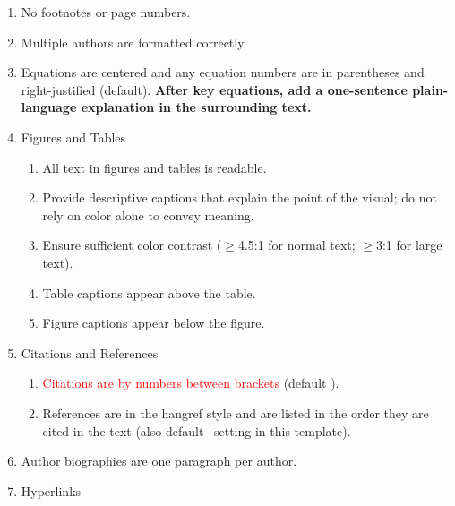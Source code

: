 \documentclass{scspaperproc}
\theoremstyle{scsthe}
\begin{document}
\begin{enumerate}
\begin{enumerate}
            \item Subsection headings are set in \textbf{Boldface Headline Style} (default in this template).
            \item \textbf{Follow a logical order (\textbackslash section $\rightarrow$ \textbackslash subsection $\rightarrow$ \textbackslash subsubsection); do    not skip levels}.
        \end{enumerate}
        \item No footnotes or page numbers.
        \item Multiple authors are formatted correctly.
        \item Equations are centered and any equation numbers are in parentheses and right-justified (default). \textbf{After key equations, add a one-sentence plain-language explanation in the surrounding text.}
        \item Figures and Tables
        \begin{enumerate}
            \item All text in figures and tables is readable.
            \item Provide descriptive captions that explain the point of the visual;    do not rely on color alone to convey meaning.
            \item Ensure sufficient color contrast ($\ge$4.5:1 for normal text;         $\ge$3:1 for large text).
            \item Table captions appear above the table.
            \item Figure captions appear below the figure.
        \end{enumerate}
        \item Citations and References
        \begin{enumerate}
            \item \textcolor{red}{Citations are by numbers between brackets} (default \BibTeX).
            \item References are in the hangref style and are listed in the order they are cited in the text (also default \BibTeX\ setting in this template).
        \end{enumerate}
        \item Author biographies are one paragraph per author.
        \item Hyperlinks

\end{enumerate}
\end{document}
